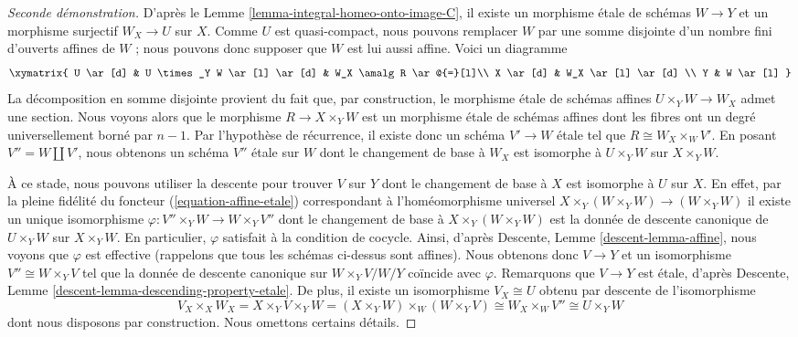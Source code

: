\begin{proof}[Seconde d\'emonstration]
\medskip\noindent
D'apr\`es
le Lemme \ref{lemma-integral-homeo-onto-image-C},
il existe un morphisme \'etale de sch\'emas $W \to Y$ et un
morphisme surjectif $W_X \to U$ sur $X$.
Comme $U$ est quasi-compact, nous pouvons remplacer $W$ par une somme disjointe d'un
nombre fini d'ouverts affines de $W$ ; nous pouvons donc supposer que $W$
est lui aussi affine. Voici un diagramme
$$
\xymatrix{
U \ar[d] & U \times_Y W \ar[l] \ar[d] & W_X \amalg R \ar@{=}[l]\\
X \ar[d] & W_X \ar[l] \ar[d] \\
Y & W \ar[l]
}
$$
La d\'ecomposition en somme disjointe provient du fait que, par construction, le
morphisme \'etale de sch\'emas affines $U \times_Y W \to W_X$ admet une section.
Nous voyons alors que le morphisme $R \to X \times_Y W$ est un morphisme \'etale
de sch\'emas affines dont les fibres ont un degr\'e universellement born\'e
par $n - 1$. Par l'hypoth\`ese de r\'ecurrence, il existe donc un sch\'ema
$V' \to W$ \'etale tel que $R \cong W_X \times_W V'$.
En posant $V'' = W \amalg V'$, nous obtenons un sch\'ema $V''$ \'etale sur $W$ dont le
changement de base \`a $W_X$ est isomorphe \`a $U \times_Y W$
sur $X \times_Y W$.

\medskip\noindent
\`A ce stade, nous pouvons utiliser la descente pour trouver $V$ sur $Y$ dont le
changement de base \`a $X$ est isomorphe \`a $U$ sur $X$. En effet, par la pleine
fid\'elit\'e du foncteur (\ref{equation-affine-etale})
correspondant \`a l'hom\'eomorphisme universel
$X \times_Y (W \times_Y W) \to (W \times_Y W)$
il existe un unique isomorphisme $\varphi : V'' \times_Y W \to W \times_Y V''$
dont le changement de base \`a $X \times_Y (W \times_Y W)$ est la donn\'ee de
descente canonique de $U \times_Y W$ sur $X \times_Y W$. En particulier,
$\varphi$ satisfait \`a la condition de cocycle. Ainsi, d'apr\`es
Descente, Lemme \ref{descent-lemma-affine},
nous voyons que $\varphi$ est effective (rappelons que tous les sch\'emas ci-dessus sont affines).
Nous obtenons donc $V \to Y$ et un isomorphisme $V'' \cong W \times_Y V$
tel que la donn\'ee de descente canonique sur $W \times_Y V/W/Y$ co\"incide
avec $\varphi$. Remarquons que $V \to Y$ est \'etale, d'apr\`es
Descente, Lemme \ref{descent-lemma-descending-property-etale}.
De plus, il existe un isomorphisme $V_X \cong U$ obtenu par
descente de l'isomorphisme
$$
V_X \times_X W_X =
X \times_Y V \times_Y W =
(X \times_Y W) \times_W (W \times_Y V) \cong
W_X  \times_W V'' \cong U \times_Y W
$$
dont nous disposons par construction. Nous omettons certains d\'etails.
\end{proof}

